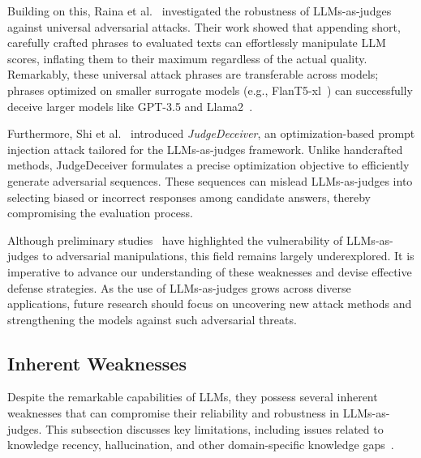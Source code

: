 Building on this, Raina et al.~\cite{raina2024llm} investigated the robustness of LLMs-as-judges against universal adversarial attacks. Their work showed that appending short, carefully crafted phrases to evaluated texts can effortlessly manipulate LLM scores, inflating them to their maximum regardless of the actual quality. Remarkably, these universal attack phrases are transferable across models; phrases optimized on smaller surrogate models (e.g., FlanT5-xl~\cite{chung2024scaling}) can successfully deceive larger models like GPT-3.5 and Llama2~\cite{touvron2023llama}.

Furthermore, Shi et al.~\cite{shi2024optimization} introduced \textit{JudgeDeceiver}, an optimization-based prompt injection attack tailored for the LLMs-as-judges framework. Unlike handcrafted methods, JudgeDeceiver formulates a precise optimization objective to efficiently generate adversarial sequences. These sequences can mislead LLMs-as-judges into selecting biased or incorrect responses among candidate answers, thereby compromising the evaluation process.

Although preliminary studies~\cite{shi2024optimization, raina2024llm} have highlighted the vulnerability of LLMs-as-judges to adversarial manipulations, this field remains largely underexplored. 
It is imperative to advance our understanding of these weaknesses and devise effective defense strategies. 
As the use of LLMs-as-judges grows across diverse applications, future research should focus on uncovering new attack methods and strengthening the models against such adversarial threats.





\subsection{Inherent Weaknesses}
\label{sec:weaknesses}
Despite the remarkable capabilities of LLMs, they possess several inherent weaknesses that can compromise their reliability and robustness in LLMs-as-judges. This subsection discusses key limitations, including issues related to knowledge recency, hallucination, and other domain-specific knowledge gaps~\cite{zhao2023survey}.

